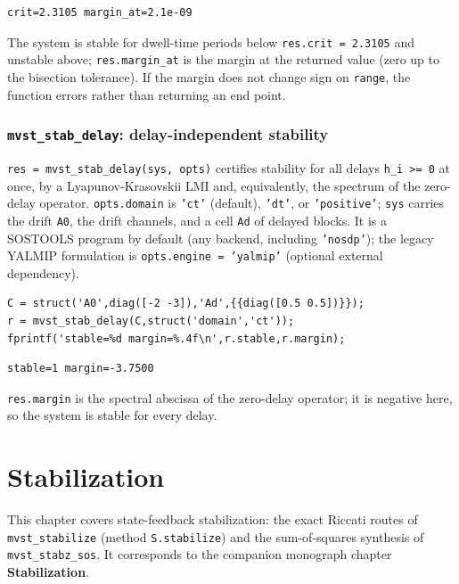 \documentclass[11pt,oneside]{report}
\newcommand{\code}[1]{\texttt{#1}}
\begin{document}
\begin{lstlisting}[style=outputstyle]
crit=2.3105 margin_at=2.1e-09
\end{lstlisting}

The system is stable for dwell-time periods below \code{res.crit = 2.3105} and unstable
above; \code{res.margin\_at} is the margin at the returned value (zero up to the
bisection tolerance). If the margin does not change sign on \code{range}, the
function errors rather than returning an end point.

\hypertarget{mvst_stab_delay-delay-independent-stability}{%
\subsection{\texorpdfstring{\code{mvst\_stab\_delay}: delay-independent stability}{mvst\_stab\_delay: delay-independent stability}}\label{mvst_stab_delay-delay-independent-stability}}

\code{res = mvst\_stab\_delay(sys, opts)} certifies stability for all delays
\code{h\_i \textgreater{}= 0} at once, by a Lyapunov-Krasovskii LMI and, equivalently, the
spectrum of the zero-delay operator. \code{opts.domain} is \code{'ct'} (default), \code{'dt'},
or \code{'positive'}; \code{sys} carries the drift \code{A0}, the drift channels, and a cell
\code{Ad} of delayed blocks. It is a SOSTOOLS program by default (any backend, including \code{'nosdp'}); the legacy
YALMIP formulation is \code{opts.engine = 'yalmip'} (optional external dependency).

\begin{lstlisting}[style=matlabstyle]
C = struct('A0',diag([-2 -3]),'Ad',{{diag([0.5 0.5])}});
r = mvst_stab_delay(C,struct('domain','ct'));
fprintf('stable=%d margin=%.4f\n',r.stable,r.margin);
\end{lstlisting}

\begin{lstlisting}[style=outputstyle]
stable=1 margin=-3.7500
\end{lstlisting}

\code{res.margin} is the spectral abscissa of the zero-delay operator; it is
negative here, so the system is stable for every delay.


\hypertarget{chap:04-stabilization}{%
\chapter{Stabilization}\label{chap:04-stabilization}}

This chapter covers state-feedback stabilization: the exact Riccati routes of
\code{mvst\_stabilize} (method \code{S.stabilize}) and the sum-of-squares synthesis of
\code{mvst\_stabz\_sos}. It corresponds to the companion monograph chapter
\textbf{Stabilization}.
\end{document}
